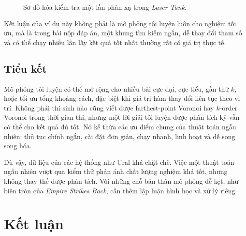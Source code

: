 \documentclass[11pt]{article}
\begin{document}
\begin{figure}[htbp]
\centering
{}
\caption{Sơ đồ hóa kiểm tra một lần phản xạ trong \textit{Laser Tank}.}
\end{figure}

Kết luận của ví dụ này không phải là mô phỏng tôi luyện luôn cho nghiệm tối
ưu, mà là trong bài nộp đáp án, một khung tìm kiếm ngắn, dễ thay đổi tham số
và có thể chạy nhiều lần lấy kết quả tốt nhất thường rất có giá trị thực tế.

\subsection{Tiểu kết}

Mô phỏng tôi luyện có thể mở rộng cho nhiều bài cực đại, cực tiểu, gần thứ
\(k\), hoặc tối ưu tổng khoảng cách, đặc biệt khi giá trị hàm thay đổi liên tục
theo vị trí. Không phải thí sinh nào cũng viết được farthest-point Voronoi hay
\(k\)-order Voronoi trong thời gian thi, nhưng một lời giải tôi luyện được phân
tích kỹ vẫn có thể cho kết quả đủ tốt. Nó kế thừa các ưu điểm chung của thuật
toán ngẫu nhiên: thủ tục chính ngắn, cài đặt đơn giản, chạy nhanh, linh hoạt
và dễ song song hóa.

Dù vậy, dữ liệu của các hệ thống như Ural khá chặt chẽ. Việc một thuật toán
ngẫu nhiên vượt qua kiểm thử phản ánh chất lượng nghiệm khá tốt, nhưng không
thay thế được phân tích. Với những chỗ bản thân mô phỏng dễ kẹt, như biên tròn
của \textit{Empire Strikes Back}, cần thêm lập luận hình học và xử lý riêng.

\section{Kết luận}
\end{document}
